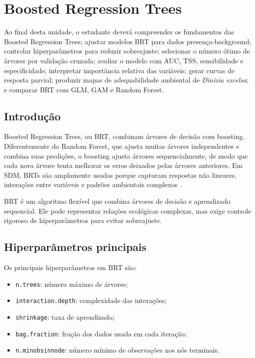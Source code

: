 \chapter[BRT]{Boosted Regression Trees}

\begin{objetivos}
	Ao final desta unidade, o estudante deverá compreender os fundamentos das Boosted Regression Trees; ajustar modelos BRT para dados presença-background; controlar hiperparâmetros para reduzir sobreajuste; selecionar o número ótimo de árvores por validação cruzada; avaliar o modelo com AUC, TSS, sensibilidade e especificidade; interpretar importância relativa das variáveis; gerar curvas de resposta parcial; produzir mapas de adequabilidade ambiental de \textit{Dinizia excelsa}; e comparar BRT com GLM, GAM e Random Forest.
\end{objetivos}

\section{Introdução}

Boosted Regression Trees, ou BRT, combinam árvores de decisão com boosting. Diferentemente do Random Forest, que ajusta muitas árvores independentes e combina suas predições, o boosting ajusta árvores sequencialmente, de modo que cada nova árvore tenta melhorar os erros deixados pelas árvores anteriores. Em SDM, BRTs são amplamente usadas porque capturam respostas não lineares, interações entre variáveis e padrões ambientais complexos \parencite{elith2008working,elith2009,guisan2017habitat}.

\begin{conceito}[title={\faBook\quad BRT em SDM}]
	BRT é um algoritmo flexível que combina árvores de decisão e aprendizado sequencial. Ele pode representar relações ecológicas complexas, mas exige controle rigoroso de hiperparâmetros para evitar sobreajuste.
\end{conceito}

\section{Hiperparâmetros principais}

Os principais hiperparâmetros em BRT são:

\begin{itemize}
	\item \texttt{n.trees}: número máximo de árvores;
	\item \texttt{interaction.depth}: complexidade das interações;
	\item \texttt{shrinkage}: taxa de aprendizado;
	\item \texttt{bag.fraction}: fração dos dados usada em cada iteração;
	\item \texttt{n.minobsinnode}: número mínimo de observações nos nós terminais.
\end{itemize}

